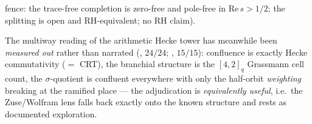 fence: the trace-free completion is zero-free and pole-free in $\mathrm{Re}\,s>1/2$; the splitting is open and RH-equivalent; no RH claim).

  The multiway reading of the arithmetic
Hecke tower has meanwhile been \emph{measured out} rather than narrated
(, $24/24$;
, $15/15$): confluence is exactly
Hecke commutativity ($=$ CRT), the branchial structure is the $[4,2]_q$ Grassmann cell
count, the $\sigma$-quotient is confluent everywhere with only the half-orbit
\emph{weighting} breaking at the ramified place --- the adjudication is
\emph{equivalently useful}, i.e.\ the Zuse/Wolfram lens falls back exactly onto the known
structure and rests as documented exploration.
